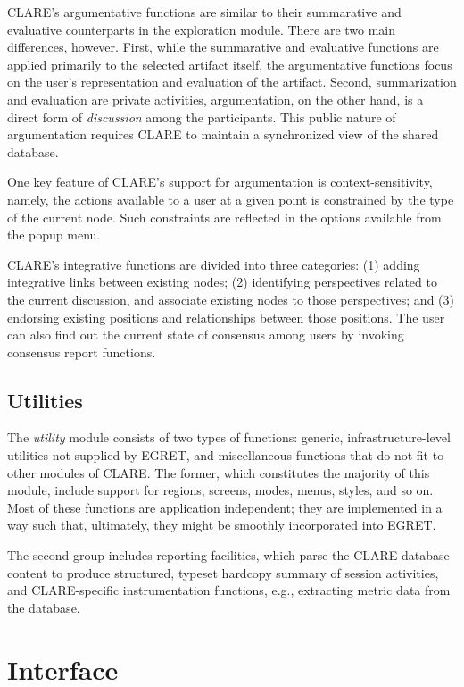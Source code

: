 CLARE's argumentative functions are similar to their summarative and
evaluative counterparts in the exploration module. There are two main
differences, however. First, while the summarative and evaluative functions
are applied primarily to the selected artifact itself, the argumentative
functions focus on the user's representation and evaluation of the
artifact. Second, summarization and evaluation are private activities,
argumentation, on the other hand, is a direct form of {\it discussion\/} among
the participants. This public nature of argumentation requires CLARE to
maintain a synchronized view of the shared database.

One key feature of CLARE's support for argumentation is
context-sensitivity, namely, the actions available to a user at a given
point is constrained by the type of the current node. Such constraints are
reflected in the options available from the popup menu.

CLARE's integrative functions are divided into three categories: (1) adding
integrative links between existing nodes; (2) identifying perspectives
related to the current discussion, and associate existing nodes to those
perspectives; and (3) endorsing existing positions and relationships
between those positions. The user can also find out the current state of
consensus among users by invoking consensus report functions.


\subsection{Utilities}
\label{sec:utilities}

The {\it utility\/} module consists of two types of functions: generic,
infrastructure-level utilities not supplied by EGRET, and miscellaneous
functions that do not fit to other modules of CLARE. The former, which
constitutes the majority of this module, include support for regions,
screens, modes, menus, styles, and so on. Most of these functions are
application independent; they are implemented in a way such that,
ultimately, they might be smoothly incorporated into EGRET.

The second group includes reporting facilities, which parse the CLARE
database content to produce structured, typeset hardcopy summary of session
activities, and CLARE-specific instrumentation functions, e.g., extracting
metric data from the database.


\section{Interface}
\label{sec:interface}

